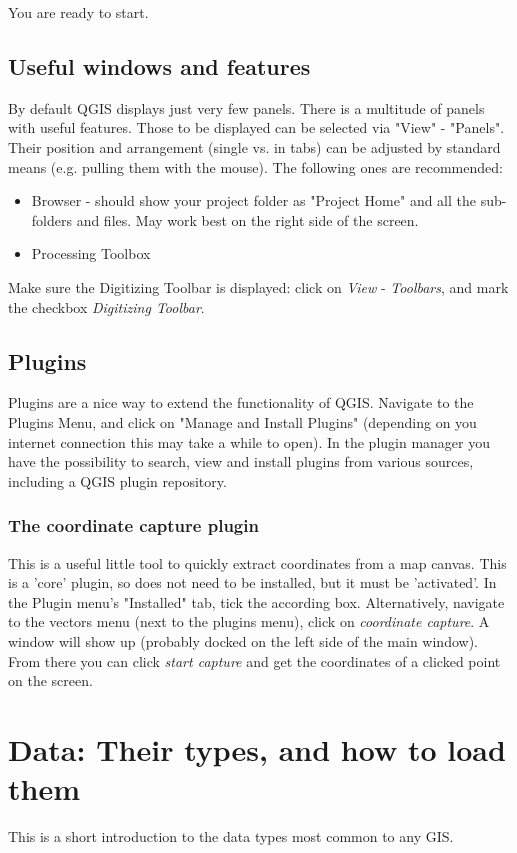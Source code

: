 \documentclass[12pt,a4paper]{scrartcl}
\begin{document}
You are ready to start.

\subsection{Useful windows and features}
\label{subsec:qgis_adjust}
By default QGIS displays just very few panels. There is a multitude of panels with useful features. Those to be displayed can be selected via "View" - "Panels". Their position and arrangement (single vs. in tabs) can be adjusted by standard means (e.g. pulling them with the mouse). The following ones are recommended:
\begin{itemize}
	\item Browser - should show your project folder as "Project Home"  and all the sub-folders and files. May work best on the right side of the screen.
	\item Processing Toolbox
\end{itemize}

Make sure the Digitizing Toolbar is displayed: click on \textit{View} - \textit{Toolbars}, and mark the checkbox \textit{Digitizing Toolbar}.

\subsection{Plugins}
Plugins are a nice way to extend the functionality of QGIS. Navigate to the Plugins Menu, and click on "Manage and Install Plugins" (depending on you internet connection this may take a while to open). In the plugin manager you have the possibility to search, view and install plugins from various sources, including a QGIS plugin repository. 

\subsubsection{The coordinate capture plugin}
\label{coordcap}
This is a useful little tool to quickly extract coordinates from a map canvas. This is a 'core' plugin, so does not need to be installed, but it must be 'activated'. In the Plugin menu's "Installed" tab, tick the according box. Alternatively, navigate to the vectors menu (next to the plugins menu), click on \textit{coordinate capture}. A window will show up (probably docked on the left side of the main window). From there you can click \textit{start capture} and get the coordinates of a clicked point on the screen.



\section{Data: Their types, and how to load them}
This is a short introduction to the data types most common to any GIS.
\end{document}
